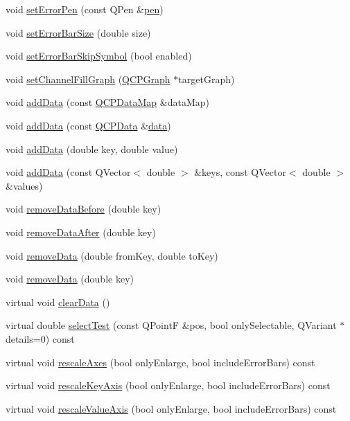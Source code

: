 \begin{DoxyCompactItemize}
\item 
void \hyperlink{class_q_c_p_graph_abd4c7f81939e10776ea64603a704f22a}{set\-Error\-Pen} (const Q\-Pen \&\hyperlink{class_q_c_p_abstract_plottable_a41d060007cc6b3037c9c04d22d0c0398}{pen})
\item 
void \hyperlink{class_q_c_p_graph_a10f50c5495ce45ef559ec2066194a335}{set\-Error\-Bar\-Size} (double size)
\item 
void \hyperlink{class_q_c_p_graph_ab1c1ee03d8dd94676a564e5e5f11aac2}{set\-Error\-Bar\-Skip\-Symbol} (bool enabled)
\item 
void \hyperlink{class_q_c_p_graph_a2d03156df1b64037a2e36cfa50351ca3}{set\-Channel\-Fill\-Graph} (\hyperlink{class_q_c_p_graph}{Q\-C\-P\-Graph} $\ast$target\-Graph)
\item 
void \hyperlink{class_q_c_p_graph_aa5c6181d84db72ce4dbe9dc15a34ef4f}{add\-Data} (const \hyperlink{qcustomplot_8h_a84a9c4a4c2216ccfdcb5f3067cda76e3}{Q\-C\-P\-Data\-Map} \&data\-Map)
\item 
void \hyperlink{class_q_c_p_graph_a80cc91e1e0ef77eb50afc5b366d0efd9}{add\-Data} (const \hyperlink{class_q_c_p_data}{Q\-C\-P\-Data} \&\hyperlink{class_q_c_p_graph_a8f4c17d993df4759c7426db45b33fbc0}{data})
\item 
void \hyperlink{class_q_c_p_graph_a0bf98b1972286cfb7b1c4b7dd6ae2012}{add\-Data} (double key, double value)
\item 
void \hyperlink{class_q_c_p_graph_ab6da6377541fe80d892a9893a92db9c6}{add\-Data} (const Q\-Vector$<$ double $>$ \&keys, const Q\-Vector$<$ double $>$ \&values)
\item 
void \hyperlink{class_q_c_p_graph_a9fe0b3e54e8c7b61319bd03337e21e99}{remove\-Data\-Before} (double key)
\item 
void \hyperlink{class_q_c_p_graph_ae42d645ef617cfc75fc0df58e62c522a}{remove\-Data\-After} (double key)
\item 
void \hyperlink{class_q_c_p_graph_a4a0fde50b7db9db0a85b5c5b6b10098f}{remove\-Data} (double from\-Key, double to\-Key)
\item 
void \hyperlink{class_q_c_p_graph_a4a706020b4318f118381648ef18aca3f}{remove\-Data} (double key)
\item 
virtual void \hyperlink{class_q_c_p_graph_ad4e94a4e44e5e76fbec81a72a977157d}{clear\-Data} ()
\item 
virtual double \hyperlink{class_q_c_p_graph_abc9ff375aabcf2d21cca33d6baf85772}{select\-Test} (const Q\-Point\-F \&pos, bool only\-Selectable, Q\-Variant $\ast$details=0) const 
\item 
virtual void \hyperlink{class_q_c_p_graph_aa35b75b9032800d783df749c8a004ee9}{rescale\-Axes} (bool only\-Enlarge, bool include\-Error\-Bars) const 
\item 
virtual void \hyperlink{class_q_c_p_graph_a2108a729046b0ab6e0516afb249dab13}{rescale\-Key\-Axis} (bool only\-Enlarge, bool include\-Error\-Bars) const 
\item 
virtual void \hyperlink{class_q_c_p_graph_a2ba0e1df416486d7e74299ef8cf68bba}{rescale\-Value\-Axis} (bool only\-Enlarge, bool include\-Error\-Bars) const 
\end{DoxyCompactItemize}
